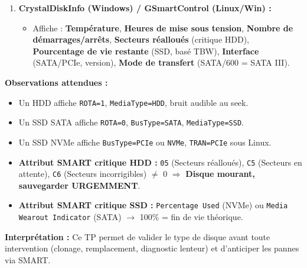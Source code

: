 \documentclass[11pt]{article}
\begin{document}
\begin{experience}
\begin{enumerate}
\begin{lstlisting}[language=]
# Infos SMART détaillées (installer smartmontools)
sudo smartctl -a /dev/sda   # pour disque SATA
sudo smartctl -a /dev/nvme0 # pour NVMe

# Benchmark rapide lecture séquentielle (attention : cache !)
sudo hdparm -Tt /dev/sda    # -T cache, -t disque
# Ou plus réaliste avec fio (Flexible I/O Tester)
fio --name=seqread --rw=read --direct=1 --ioengine=libaio --bs=1M --size=1G --numjobs=1 --runtime=30 --group_reporting --filename=/dev/sda
\end{lstlisting}
    \item \textbf{CrystalDiskInfo (Windows) / GSmartControl (Linux/Win) :}
    \begin{itemize}
        \item Affiche : \textbf{Température}, \textbf{Heures de mise sous tension}, \textbf{Nombre de démarrages/arrêts}, \textbf{Secteurs réalloués} (critique HDD), \textbf{Pourcentage de vie restante} (SSD, basé TBW), \textbf{Interface} (SATA/PCIe, version), \textbf{Mode de transfert} (SATA/600 = SATA III).
    \end{itemize}
\end{enumerate}

\textbf{Observations attendues :}
\begin{itemize}
    \item Un HDD affiche \texttt{ROTA=1}, \texttt{MediaType=HDD}, bruit audible au seek.
    \item Un SSD SATA affiche \texttt{ROTA=0}, \texttt{BusType=SATA}, \texttt{MediaType=SSD}.
    \item Un SSD NVMe affiche \texttt{BusType=PCIe} ou \texttt{NVMe}, \texttt{TRAN=PCIe} sous Linux.
    \item \textbf{Attribut SMART critique HDD :} \texttt{05} (Secteurs réalloués), \texttt{C5} (Secteurs en attente), \texttt{C6} (Secteurs incorrigibles) $\neq$ 0 $\Rightarrow$ \textbf{Disque mourant, sauvegarder URGEMMENT}.
    \item \textbf{Attribut SMART critique SSD :} \texttt{Percentage Used} (NVMe) ou \texttt{Media Wearout Indicator} (SATA) $\to$ 100\% = fin de vie théorique.
\end{itemize}

\textbf{Interprétation :} Ce TP permet de valider le type de disque avant toute intervention (clonage, remplacement, diagnostic lenteur) et d'anticiper les pannes via SMART.
\end{experience}
\end{document}

